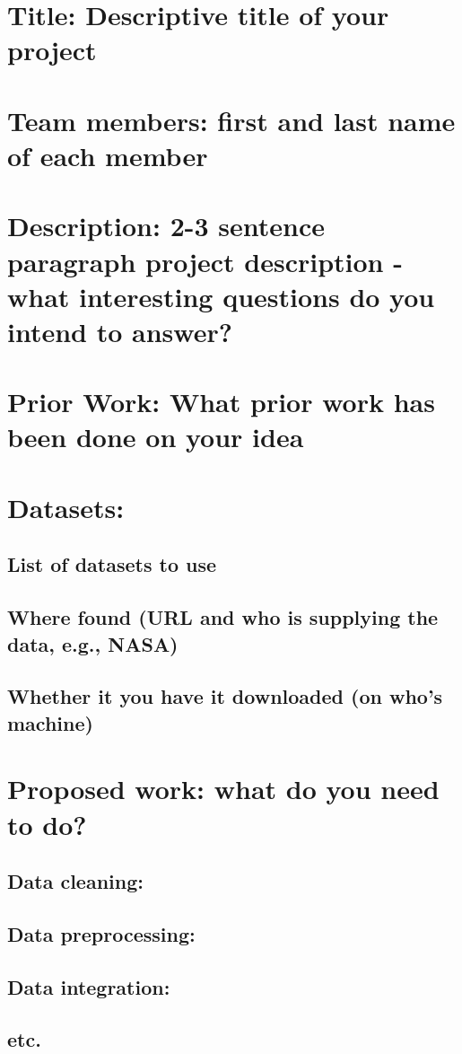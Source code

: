 
\section{Title: Descriptive title of your project}
\section{ Team members: first and last name of each member}
\section{ Description: 2-3 sentence paragraph project description - what interesting questions do
you intend to answer?}
\section{ Prior Work: What prior work has been done on your idea}
\section{Datasets:}
\subsection{List of datasets to use}
\subsection{Where found (URL and who is supplying the data, e.g., NASA)}
\subsection{Whether it you have it downloaded (on who’s machine)}
\section{Proposed work: what do you need to do?}
\subsection{Data cleaning:}
\subsection{Data preprocessing:}
\subsection{Data integration:}
\subsection{etc.}
